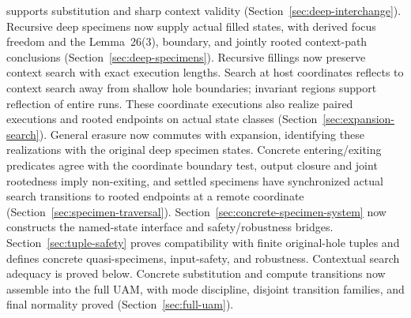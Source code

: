 supports substitution and sharp context validity (Section~\ref{sec:deep-interchange}).
Recursive deep specimens now supply actual filled states, with derived
focus freedom and the Lemma~26(3), boundary, and jointly rooted context-path
conclusions (Section~\ref{sec:deep-specimens}). Recursive fillings now preserve
context search with exact execution lengths. Search at host coordinates reflects
to context search away from shallow hole boundaries; invariant regions support
reflection of entire runs. These coordinate executions also realize paired
executions and rooted endpoints on actual state classes
(Section~\ref{sec:expansion-search}). General erasure now commutes with
expansion, identifying these realizations with the original deep specimen
states. Concrete entering/exiting predicates agree with the coordinate boundary
test, output closure and joint rootedness imply non-exiting, and settled
specimens have synchronized actual search transitions to rooted endpoints at
a remote coordinate (Section~\ref{sec:specimen-traversal}). Section~\ref{sec:concrete-specimen-system} now constructs the named-state interface and safety/robustness bridges.
Section~\ref{sec:tuple-safety} proves compatibility with finite original-hole
tuples and defines concrete quasi-specimens, input-safety, and robustness.
Contextual search adequacy is proved below. Concrete substitution and compute
transitions now assemble into the full UAM, with mode discipline, disjoint
transition families, and final normality proved (Section~\ref{sec:full-uam}).

